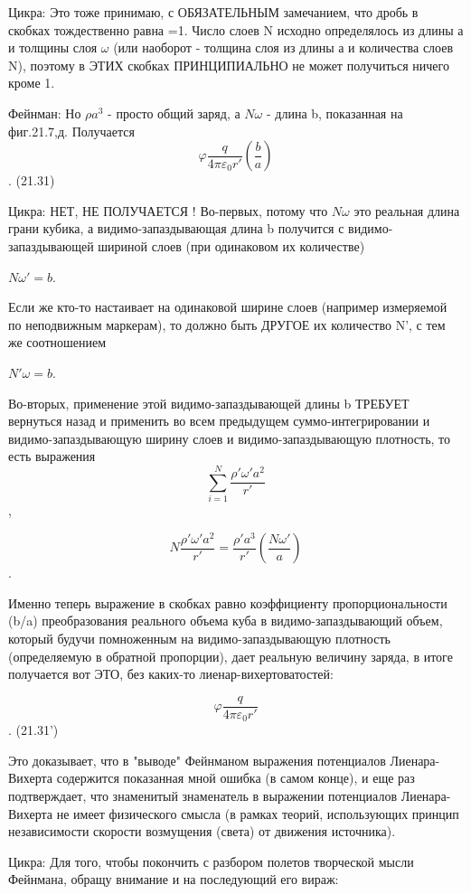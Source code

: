 \documentclass{article}
\begin{document}
Цикра:
Это тоже принимаю, с ОБЯЗАТЕЛЬНЫМ замечанием, что дробь в скобках тождественно равна =1.
Число слоев N исходно определялось из длины $а$ и толщины слоя $\omega$ (или наоборот - толщина слоя из длины а и количества слоев N), поэтому в ЭТИХ скобках ПРИНЦИПИАЛЬНО не может получиться ничего кроме 1.


Фейнман:
Но $\rho a^3$ - просто общий заряд, а  $N\omega$ - длина b, показанная на фиг.21.7,д.
Получается
$$\varphi\frac{q}{4\pi\varepsilon_0 r'}\left( \frac{b}{a}\right )$$  .   (21.31)

Цикра:
НЕТ, НЕ ПОЛУЧАЕТСЯ !
Во-первых, потому что $N\omega$ это реальная длина грани кубика, а видимо-запаздывающая длина b получится с видимо-запаздывающей шириной слоев (при одинаковом их количестве)

 $N\omega'=b$.

Если же кто-то настаивает на одинаковой ширине слоев (например измеряемой по неподвижным маркерам), то должно быть ДРУГОЕ их количество N', с тем же соотношением

$N'\omega=b$.

Во-вторых, применение этой видимо-запаздывающей длины b  ТРЕБУЕТ вернуться  назад и применить во всем предыдущем суммо-интегрировании и видимо-запаздывающую ширину слоев и видимо-запаздывающую плотность, то есть выражения
$$\sum\limits_{i=1}^N \frac{\rho' \omega' a^2}{r'}$$,

$$N\frac{\rho' \omega' a^2}{r'}=\frac{\rho' a^3}{r'}\left (\frac{N\omega'}{a}\right )$$.

Именно теперь выражение в скобках равно коэффициенту пропорциональности (b/a) преобразования реального объема куба в видимо-запаздывающий объем, который будучи помноженным на видимо-запаздывающую плотность (определяемую в обратной пропорции), дает реальную величину заряда, в итоге получается вот ЭТО, без каких-то лиенар-вихертоватостей:

$$\varphi\frac{q}{4\pi\varepsilon_0 r'}$$  .   (21.31')

Это доказывает, что в "выводе" Фейнманом выражения потенциалов Лиенара-Вихерта содержится показанная мной ошибка (в самом конце), и еще раз подтверждает, что знаменитый знаменатель в выражении потенциалов Лиенара-Вихерта не имеет физического смысла (в рамках теорий, использующих принцип независимости скорости возмущения (света) от движения источника).

Цикра:
Для того, чтобы покончить с разбором полетов творческой мысли Фейнмана, обращу внимание и на последующий его вираж:
\end{document}
